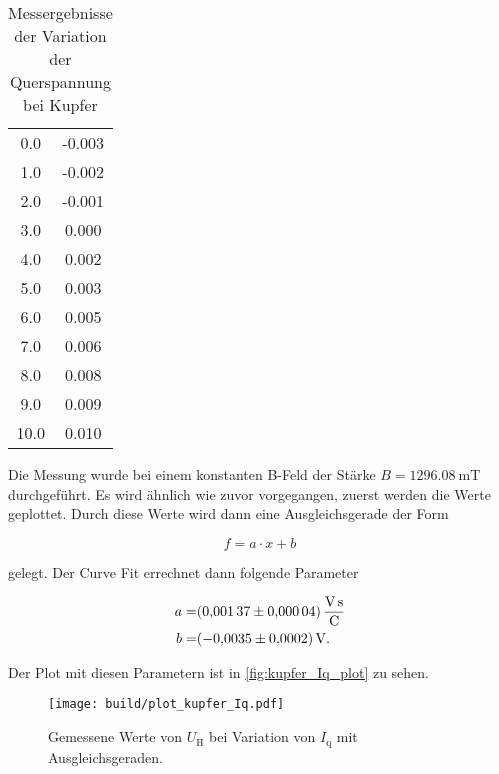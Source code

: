 \begin{table}
    \centering
    \caption{Messergebnisse der Variation der Querspannung bei Kupfer}
    \label{tab:werte_kupfer_Iq}
    \begin{tabular}{S[table-format=1.1] S[table-format=-1.3]}
        \toprule
         &  \\
         & -0.003 \\
        1.0 & -0.002\\
        2.0 & -0.001\\
        3.0 & 0.000\\
        4.0 & 0.002\\
        5.0 & 0.003\\
        6.0 & 0.005\\
        7.0 & 0.006\\
        8.0 & 0.008\\
        9.0 & 0.009\\
        10.0 & 0.010\\
        \bottomrule
    \end{tabular}
\end{table}

Die Messung wurde bei einem konstanten B-Feld der Stärke $B = \SI{1296.08}{\milli\tesla}$ durchgeführt.
Es wird ähnlich wie zuvor vorgegangen, zuerst werden die Werte geplottet.
Durch diese Werte wird dann eine Ausgleichsgerade der Form

\begin{equation}
    f = a \cdot x + b
    \label{eq:gerade2}
\end{equation}

gelegt.
Der Curve Fit errechnet dann folgende Parameter

\begin{align*}
    a =& \SI{0.00137+-0.00004}{\volt\second\per\coulomb} \\
    b =& \SI{ -0.0035+-0.0002}{\volt}.
    \label{eq:params3}
\end{align*}

Der Plot mit diesen Parametern ist in \autoref{fig:kupfer_Iq_plot} zu sehen.

\begin{figure}
    \centering
    \texttt{[image: build/plot\_kupfer\_Iq.pdf]}
    \caption{Gemessene Werte von $U_\text{H}$ bei Variation von $I_\text{q}$ mit Ausgleichsgeraden.\cite{numpy}}
    \label{fig:kupfer_Iq_plot}
\end{figure}

